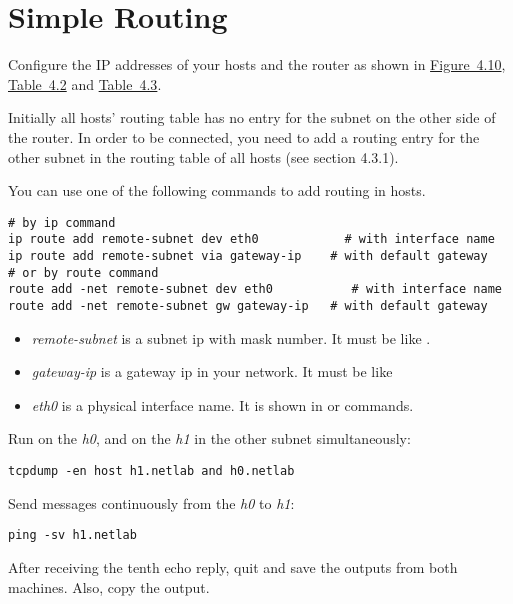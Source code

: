 \documentclass{../UTNetLab}
\begin{document}
\section{Simple Routing}
Configure the IP addresses of your hosts and the router as shown in \hyperref[fig:4.10]{Figure~4.10}, \hyperref[tab:4.2]{Table~4.2} and \hyperref[tab:4.3]{Table~4.3}.

Initially all hosts’ routing table has no entry for the subnet on the other side of the router.
In order to be connected, you need to add a routing entry for the other subnet in the routing table of all hosts (see section 4.3.1).

You can use one of the following commands to add routing in hosts.
\begin{lstlisting}[emph={eth0,gateway-ip,remote-subnet},morekeywords={[3]add,dev,via,gw}]
# by ip command
ip route add remote-subnet dev eth0            # with interface name
ip route add remote-subnet via gateway-ip    # with default gateway
# or by route command
route add -net remote-subnet dev eth0           # with interface name
route add -net remote-subnet gw gateway-ip   # with default gateway
    \end{lstlisting}
\begin{itemize}
    \item \textit{remote-subnet} is a subnet ip with mask number.
          It must be like .
    \item \textit{gateway-ip} is a gateway ip in your network.
          It must be like 
    \item \textit{eth0} is a physical interface name.
          It is shown in  or  commands.
\end{itemize}


Run  on the \textit{h0}, and  on the \textit{h1} in the other subnet simultaneously:
\begin{lstlisting}[emph={h0,h1,netlab},morekeywords={[3]host,and}]
tcpdump -en host h1.netlab and h0.netlab
    \end{lstlisting}
Send  messages continuously from the \textit{h0} to \textit{h1}:
\begin{lstlisting}[emph={h1, netlab}]
ping -sv h1.netlab
    \end{lstlisting}
After receiving the tenth echo reply, quit  and save the  outputs from both machines.
Also, copy the  output.
\end{document}
